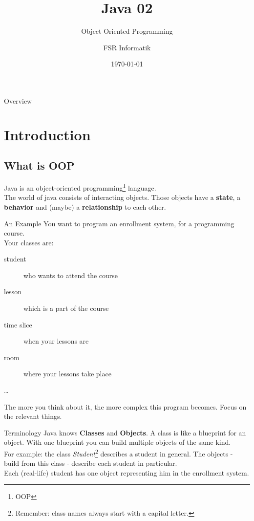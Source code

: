 

\title{Java 02}
\subtitle{Object-Oriented Programming}
\author{FSR Informatik}
\date{\today}



\begin{frame}
\titlepage
\end{frame}
\begin{frame}{Overview}
\tableofcontents
\end{frame}

\section{Introduction}
\subsection{What is OOP}
\begin{frame}{}
	Java is an object-oriented programming\footnote{OOP} language. \\
	\vspace{1em}
	The world of java consists of interacting objects. Those objects have a \textbf{state}, 
	a \textbf{behavior} and (maybe) a \textbf{relationship} to each other.
\end{frame}

\begin{frame}{An Example}
	You want to program an enrollment system, for a programming course. \\
	\vspace{1em}
	Your classes are:\\
	\begin{description}
		\item[student] who wants to attend the course
		\item[lesson] which is a part of the course
		\item[time slice] when your lessons are
		\item[room] where your lessons take place
		\item[\dots]
	\end{description}
	The more you think about it, the more complex this program becomes.
	Focus on the relevant things.
\end{frame}
	
\begin{frame}{Terminology} %
	Java knows \textbf{Classes} and \textbf{Objects}. A class is like a blueprint for an object. 
	With one blueprint you can build multiple objects of the same kind. \\
	\vspace{1em}
	For example: the class \emph{Student}\footnote{Remember: class names always start with a capital letter.} describes a student in general. 
	The objects - build from this class - describe each student in particular. \\
	Each (real-life) student has one object representing him in the enrollment system.
\end{frame}


